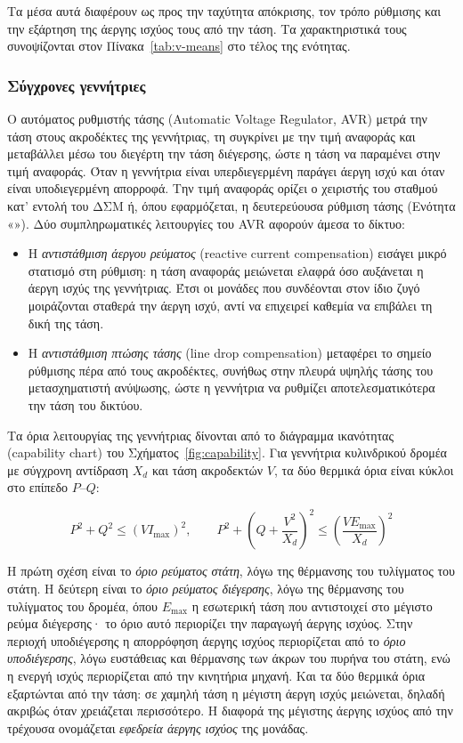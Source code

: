 Τα μέσα αυτά διαφέρουν ως προς την ταχύτητα απόκρισης, τον τρόπο ρύθμισης και την εξάρτηση
της άεργης ισχύος τους από την τάση. Τα χαρακτηριστικά τους συνοψίζονται στον
Πίνακα~\ref{tab:v-means} στο τέλος της ενότητας.

\subsubsection{Σύγχρονες γεννήτριες}
\label{sec:sg}

Ο αυτόματος ρυθμιστής τάσης (Automatic Voltage Regulator, AVR) μετρά την τάση στους
ακροδέκτες της γεννήτριας, τη συγκρίνει με την τιμή αναφοράς και μεταβάλλει μέσω του διεγέρτη
την τάση διέγερσης, ώστε η τάση να παραμένει στην τιμή αναφοράς. Όταν η γεννήτρια είναι
υπερδιεγερμένη παράγει άεργη ισχύ και όταν είναι υποδιεγερμένη απορροφά. Την τιμή αναφοράς
ορίζει ο χειριστής του σταθμού κατ' εντολή του ΔΣΜ ή, όπου εφαρμόζεται, η δευτερεύουσα
ρύθμιση τάσης (Ενότητα «»). Δύο συμπληρωματικές λειτουργίες του AVR
αφορούν άμεσα το δίκτυο:

\begin{itemize}
\item Η \emph{αντιστάθμιση άεργου ρεύματος} (reactive current compensation) εισάγει μικρό
      στατισμό στη ρύθμιση: η τάση αναφοράς μειώνεται ελαφρά όσο αυξάνεται η άεργη ισχύς της
      γεννήτριας. Έτσι οι μονάδες που συνδέονται στον ίδιο ζυγό μοιράζονται σταθερά την άεργη
      ισχύ, αντί να επιχειρεί καθεμία να επιβάλει τη δική της τάση.
\item Η \emph{αντιστάθμιση πτώσης τάσης} (line drop compensation) μεταφέρει το σημείο
      ρύθμισης πέρα από τους ακροδέκτες, συνήθως στην πλευρά υψηλής τάσης του μετασχηματιστή
      ανύψωσης, ώστε η γεννήτρια να ρυθμίζει αποτελεσματικότερα την τάση του δικτύου.
\end{itemize}

Τα όρια λειτουργίας της γεννήτριας δίνονται από το διάγραμμα ικανότητας (capability chart)
του Σχήματος~\ref{fig:capability}. Για γεννήτρια κυλινδρικού δρομέα με σύγχρονη αντίδραση
$X_d$ και τάση ακροδεκτών $V$, τα δύο θερμικά όρια είναι κύκλοι στο επίπεδο $P$--$Q$:

\begin{equation}
P^2 + Q^2 \le \left(V I_{\max}\right)^2, \qquad
P^2 + \left(Q + \frac{V^2}{X_d}\right)^2 \le \left(\frac{V E_{\max}}{X_d}\right)^2
\label{eq:capability}
\end{equation}

Η πρώτη σχέση είναι το \emph{όριο ρεύματος στάτη}, λόγω της θέρμανσης του τυλίγματος του
στάτη. Η δεύτερη είναι το \emph{όριο ρεύματος διέγερσης}, λόγω της θέρμανσης του τυλίγματος
του δρομέα, όπου $E_{\max}$ η εσωτερική τάση που αντιστοιχεί στο μέγιστο ρεύμα διέγερσης· το
όριο αυτό περιορίζει την παραγωγή άεργης ισχύος. Στην περιοχή υποδιέγερσης η απορρόφηση άεργης
ισχύος περιορίζεται από το \emph{όριο υποδιέγερσης}, λόγω ευστάθειας και θέρμανσης των άκρων
του πυρήνα του στάτη, ενώ η ενεργή ισχύς περιορίζεται από την κινητήρια μηχανή. Και τα δύο
θερμικά όρια εξαρτώνται από την τάση: σε χαμηλή τάση η μέγιστη άεργη ισχύς μειώνεται, δηλαδή
ακριβώς όταν χρειάζεται περισσότερο. Η διαφορά της μέγιστης άεργης ισχύος από την τρέχουσα
ονομάζεται \emph{εφεδρεία άεργης ισχύος} της μονάδας.

